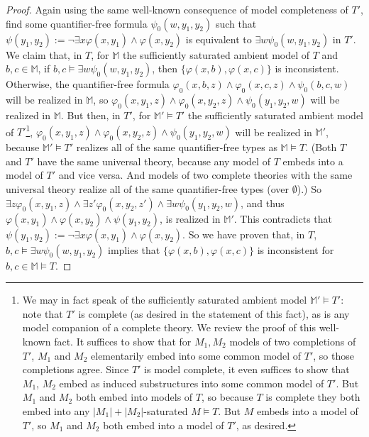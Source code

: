 \documentclass{amsart}
\theoremstyle{definition}
\theoremstyle{remark}
\numberwithin{equation}{section}
\begin{document}
\begin{proof}
   Again using the same well-known consequence of model completeness of $T'$, find some quantifier-free formula $\psi_{0}(w, y_{1}, y_{2})$ such that $\psi(y_{1}, y_{2}) := \neg \exists x \varphi(x, y_{1}) \wedge \varphi(x, y_{2})$ is equivalent to  $\exists w \psi_{0}(w, y_{1}, y_{2})$ in $T'$. We claim that, in $T$, for $\mathbb{M}$ the sufficiently saturated ambient model of $T$ and $b, c \in \mathbb{M}$, if $b, c \models \exists w \psi_{0}(w, y_{1}, y_{2})$, then $\{\varphi(x, b), \varphi(x, c) \}$ is inconsistent. Otherwise, the quantifier-free formula $\varphi_{0}(x, b, z) \wedge \varphi_{0}(x, c, z) \wedge \psi_{0}(b, c, w)$ will be realized in $\mathbb{M}$, so $\varphi_{0}(x, y_{1}, z) \wedge \varphi_{0}(x, y_{2}, z) \wedge \psi_{0}(y_{1}, y_{2}, w)$ will be realized in $\mathbb{M}$. But then, in $T'$, for $\mathbb{M}' \models T'$ the sufficiently saturated ambient model of $T'$\footnote{We may in fact speak of the sufficiently saturated ambient model $\mathbb{M}' \models T'$: note that $T'$ is complete (as desired in the statement of this fact), as is any model companion of a complete theory. We review the proof of this well-known fact. It suffices to show that for $M_{1}, M_{2}$ models of two completions of $T'$, $M_{1}$ and $M_{2}$ elementarily embed into some common model of $T'$, so those completions agree. Since $T'$ is model complete, it even suffices to show that $M_{1}$, $M_{2}$ embed as induced substructures into some common model of $T'$. But $M_{1}$ and $M_{2}$ both embed into models of $T$, so because $T$ is complete they both embed into any $|M_{1}|+|M_{2}|$-saturated $M \models T$. But $M$ embeds into a model of $T'$, so $M_{1}$ and $M_{2}$ both embed into a model of $T'$, as desired.}, $\varphi_{0}(x, y_{1}, z) \wedge \varphi_{0}(x, y_{2}, z) \wedge \psi_{0}(y_{1}, y_{2}, w)$ will be realized in $\mathbb{M}'$, because $\mathbb{M'} \models T'$ realizes all of the same quantifier-free types as $\mathbb{M} \models T$. (Both $T$ and $T'$ have the same universal theory, because any model of $T$ embeds into a model of $T'$ and vice versa. And models of two complete theories with the same universal theory realize all of the same quantifier-free types (over $\emptyset$).) So $\exists z \varphi_{0}(x, y_{1}, z) \wedge \exists z' \varphi_{0}(x, y_{2}, z') \wedge \exists w \psi_{0}(y_{1}, y_{2}, w)$, and thus $\varphi(x, y_{1}) \wedge \varphi(x, y_{2}) \wedge \psi(y_{1}, y_{2})$, is realized in $\mathbb{M}'$. This contradicts that $\psi(y_{1}, y_{2}):=\neg \exists x \varphi(x, y_{1}) \wedge \varphi(x, y_{2})$. So we have proven that, in $T$,  $b, c \models \exists w \psi_{0}(w, y_{1}, y_{2})$ implies that $\{\varphi(x, b), \varphi(x, c) \}$ is inconsistent for $b, c \in \mathbb{M} \models T$.


\end{proof}
\end{document}
